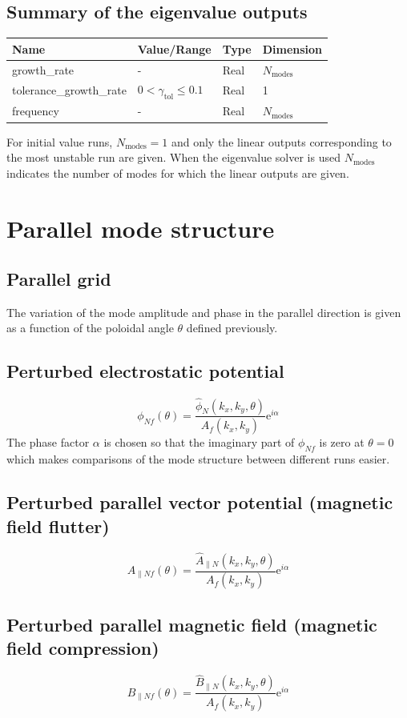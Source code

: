 \documentclass[fleqn]{report}
\begin{document}
\subsection{Summary of the eigenvalue outputs}
\begin{tabularx}{\textwidth}{|X|Y|Y|Y|}
\hline
Name & Value/Range & Type & Dimension \\
\hline
growth\_rate & - & Real & $N_\textrm{modes}$ \\
tolerance\_growth\_rate & $0<\gamma_\textrm{tol}\leq 0.1$ & Real & 1 \\
frequency & - & Real & $N_\textrm{modes}$ \\
\hline
\end{tabularx}
For initial value runs, $N_\textrm{modes}=1$ and only the linear outputs corresponding to the most unstable run are given. When the eigenvalue solver is used $N_\textrm{modes}$ indicates the number of modes for which the linear outputs are given. 


\section{Parallel mode structure}
\subsection{Parallel grid}
The variation of the mode amplitude and phase in the parallel direction is given as a function of the poloidal angle $\theta$ defined previously.
\subsection{Perturbed electrostatic potential}
$$\phi_{Nf}(\theta) = \frac{\hat{\phi}_N(k_x,k_y,\theta)}{A_f(k_x,k_y)}\textrm{e}^{i\alpha}$$
The phase factor $\alpha$ is chosen so that the imaginary part of $\phi_{Nf}$ is zero at $\theta=0$ which makes comparisons of the mode structure between different runs easier. 
\subsection{Perturbed parallel vector potential (magnetic field flutter)}
$$A_{\parallel Nf}(\theta) = \frac{\hat{A}_{\parallel N}(k_x,k_y,\theta)}{A_f(k_x,k_y)}\textrm{e}^{i\alpha}$$
\subsection{Perturbed parallel magnetic field (magnetic field compression)}
$$B_{\parallel Nf}(\theta) = \frac{\hat{B}_{\parallel N}(k_x,k_y,\theta)}{A_f(k_x,k_y)}\textrm{e}^{i\alpha}$$
\end{document}
